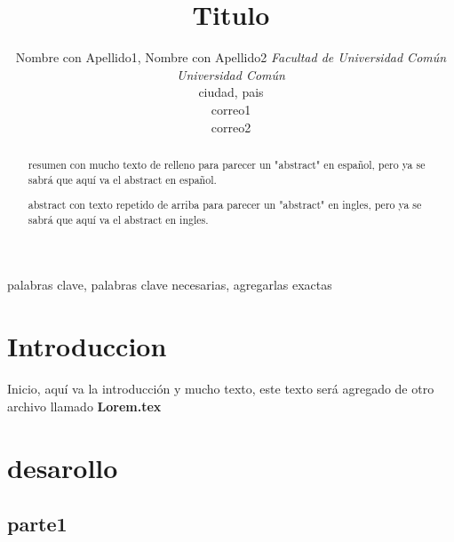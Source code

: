 \documentclass[conference]{IEEEtran}
\begin{document}
    
    \title{Titulo}

    \author
    {
        \IEEEauthorblockN
        {
            Nombre con Apellido1, Nombre con Apellido2
        }
        \IEEEauthorblockA
        {
            \textit{Facultad de Universidad Com\'un}\\
            \textit{Universidad Com\'un}\\
            ciudad, pais\\
            correo1\\correo2
        }
    }

    \maketitle

    \begin{abstract}
    resumen con mucho texto de relleno para parecer un "abstract" en espa\~nol, pero
    ya se sabr\'a que aqu\'i va el abstract en espa\~nol.
    \end{abstract}

    \def\abstractname{abstract}
    \begin{abstract}
    abstract con texto repetido de arriba para parecer un "abstract" en ingles, pero
    ya se sabr\'a que aqu\'i va el abstract en ingles.
    \end{abstract}

    \begin{IEEEkeywords}
    palabras clave, palabras clave necesarias, agregarlas exactas
    \end{IEEEkeywords}

    \section{Introduccion}

        Inicio, aqu\'i va la introducci\'on y mucho texto, este texto ser\'a agregado de otro archivo llamado \textbf{Lorem.tex}\\
        
        

    \section{desarollo}
        \subsection{parte1}
\end{document}
